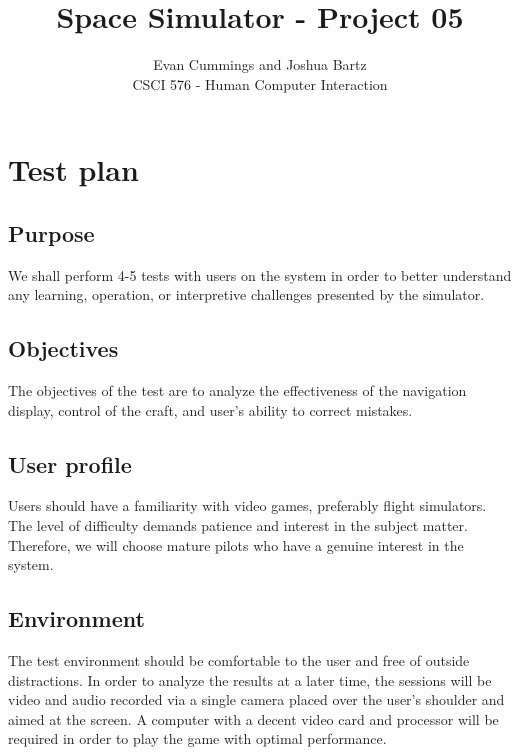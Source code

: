 
\usepackage{tabularx}
\DeclareMathOperator*{\argmax}{arg\,max}


\small

\title{Space Simulator - Project 05}
\author{Evan Cummings and Joshua Bartz\\
CSCI 576 - Human Computer Interaction}

\maketitle

\section{Test plan}

\subsection{Purpose}

We shall perform 4-5 tests with users on the system in order to better understand any learning, operation, or interpretive challenges presented by the simulator.

\subsection{Objectives}

The objectives of the test are to analyze the effectiveness of the navigation display, control of the craft, and user's ability to correct mistakes.

\subsection{User profile}

Users should have a familiarity with video games, preferably flight simulators.  The level of difficulty demands patience and interest in the subject matter.  Therefore, we will choose mature pilots who have a genuine interest in the system.

\subsection{Environment}

The test environment should be comfortable to the user and free of outside distractions.  In order to analyze the results at a later time, the sessions will be video and audio recorded via a single camera placed over the user's shoulder and aimed at the screen.  A computer with a decent video card and processor will be required in order to play the game with optimal performance.


